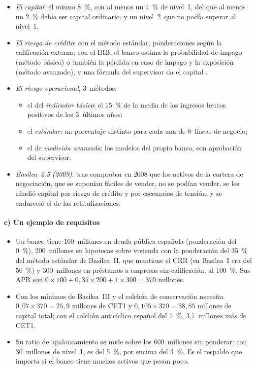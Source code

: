 \documentclass[11pt]{article}
\begin{document}
\begin{itemize}
\item \emph{El capital}: el mismo 8~\%, con al menos un 4~\% de nivel~1, del que al menos un 2~\% debía ser capital ordinario, y un nivel~2~que no podía superar al nivel~1.
\item \emph{El riesgo de crédito}: con el método estándar, ponderaciones según la calificación externa; con el IRB, el banco estima la probabilidad de impago (método básico) o también la pérdida en caso de impago y la exposición (método avanzado), y una fórmula del supervisor da el capital .
\item \emph{El riesgo operacional}, 3~métodos:
  \begin{itemize}
  \item el del \emph{indicador básico}: el 15~\% de la media de los ingresos brutos positivos de los 3~últimos años;
  \item el \emph{estándar}: un porcentaje distinto para cada una de 8~líneas de negocio;
  \item el de \emph{medición avanzada}: los modelos del propio banco, con aprobación del supervisor.
  \end{itemize}
\item \emph{Basilea~2.5 (2009)}: tras comprobar en 2008 que los activos de la cartera de negociación, que se suponían fáciles de vender, no se podían vender, se les añadió capital por riesgo de crédito y por escenarios de tensión, y se endureció el de las retitulizaciones.
\end{itemize}

\paragraph{c) Un ejemplo de requisitos}

\begin{itemize}
\item Un banco tiene 100~millones en deuda pública española (ponderación del 0~\%), 200~millones en hipotecas sobre vivienda con la ponderación del 35~\% del método estándar de Basilea~II, que mantiene el CRR (en Basilea~I era del 50~\%) y 300~millones en préstamos a empresas sin calificación, al 100~\%. Sus APR son $0\times100+0{,}35\times200+1\times300=370$ millones.
\item Con los mínimos de Basilea~III y el colchón de conservación necesita $0{,}07\times370=25{,}9$ millones de CET1 y $0{,}105\times370=38{,}85$ millones de capital total; con el colchón anticíclico español del 1~\%, 3,7~millones más de CET1.
\item Su ratio de apalancamiento se mide sobre los 600~millones sin ponderar: con 30~millones de nivel~1, es del 5~\%, por encima del 3~\%. Es el respaldo que importa si el banco tiene muchos activos que pesan poco.
\end{itemize}
\end{document}
